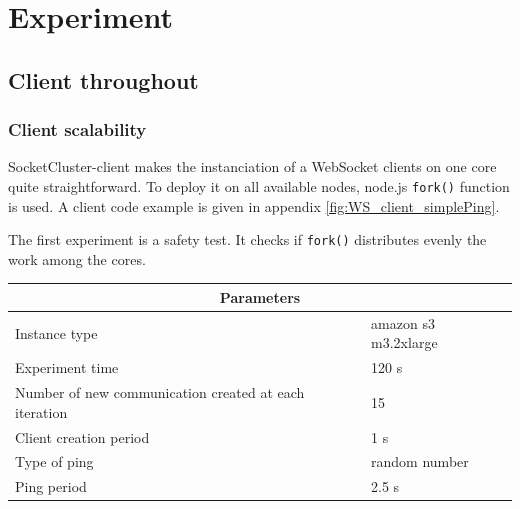 \chapter{Experiment} 
\label{Chapter4} 

\section{Client throughout}

\subsection{Client scalability}

SocketCluster-client makes the instanciation of a WebSocket clients on one core
quite straightforward. To deploy it on all available nodes, node.js
\texttt{fork()} function is used. A client code example is given in appendix
\ref{fig:WS_client_simplePing}.

The first experiment is a safety test. It checks if \texttt{fork()} distributes
evenly the work among the cores.

\begin{center}
  \begin{tabular}{ | l | l |}
  \hline
  \multicolumn{2}{|c|}{Parameters} \\
  \hline
    Instance type &  amazon s3 m3.2xlarge\\ 
    Experiment time & 120 s \\
    Number of new communication created at each iteration & 15 \\
    Client creation period & 1 s \\
    Type of ping & random number \\ 
    Ping period & 2.5 s \\ 
  \hline
  \end{tabular}
\end{center}

